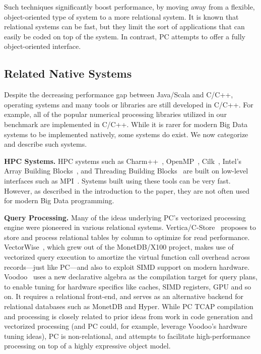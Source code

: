 Such techniques significantly boost performance, by moving away from a flexible, object-oriented
type of system to a more relational system.
It is known that relational systems can be fast, but they limit the sort of applications that
can easily be coded on top of the system.  In contrast, PC attempts to offer a fully 
object-oriented interface.

\subsection {Related Native Systems}
Despite the decreasing performance gap between Java/Scala and C/C++,
operating systems and many tools or libraries are still developed in C/C++. For example,
all of the popular numerical processing libraries utilized in our benchmark are
implemented in C/C++. 
While it is rarer for modern Big Data systems to be implemented natively, some systems do exist.
We now categorize and describe such systems.

\vspace{5pt} 
\noindent
\textbf{HPC Systems.} HPC systems such as Charm++~\cite{kale1993charm++}, OpenMP~\cite{dagum1998openmp}, Cilk~\cite{blumofe1996cilk},  Intel's Array Building
Blocks~\cite{newburn2011intel}, and Threading Building Blocks~\cite{reinders2007intel} are built on
low-level interfaces such as MPI~\cite{gropp1996high}.
Systems built using these tools can be very fast.  However, as described in the introduction to the paper, they are not often used
for modern Big Data programming.

\vspace{5pt} 
\noindent
\textbf{Query Processing.} Many of the ideas underlying PC's vectorized processing engine
were pioneered in various relational systems.  Vertica/C-Store~\cite{stonebraker2005c} proposes
to store and process relational tables by
column to optimize for read performance.
VectorWise~\cite{zukowski2012vectorwise}, which grew out of the MonetDB/X100 project, makes use of
vectorized query execution to amortize the virtual function call overhead across records---just like PC---and also
to exploit SIMD support
on modern hardware. Voodoo~\cite{pirk2016voodoo} uses a new
declarative algebra as the compilation target for query plans, to
enable tuning for hardware specifics like caches, SIMD registers,
GPU and so on. It requires a relational front-end, and serves as an alternative backend for
relational databases such as MonetDB and Hyper. While PC TCAP compilation
and processing is closely related to prior ideas from work in 
code generation and vectorized processing (and PC could, for example,
leverage Voodoo's hardware tuning ideas), PC is non-relational, and attempts to
facilitate high-performance processing on top of a 
highly expressive object model.

